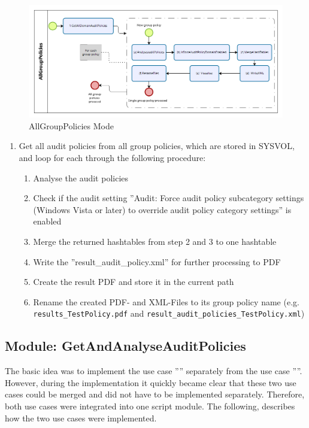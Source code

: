 \begin{figure}[H]
    \centering
    \includegraphics[width=1\linewidth]{assets/modes/allgrouppolicies.png}
    \caption{AllGroupPolicies Mode}
\end{figure}
\begin{enumerate}
    \item Get all audit policies from all group policies, which are stored in SYSVOL, and loop for each through the following procedure:
    \begin{enumerate}
        \item Analyse the audit policies
        \item Check if the audit setting ''Audit: Force audit policy subcategory settings (Windows Vista or later) to override audit policy category settings'' is enabled
        \item Merge the returned hashtables from step 2 and 3 to one hashtable
        \item Write the ''result\_audit\_policy.xml'' for further processing to PDF
        \item Create the result PDF and store it in the current path
        \item Rename the created PDF- and XML-Files to its group policy name (e.g. \lstinline|results_TestPolicy.pdf| and \lstinline|result_audit_policies_TestPolicy.xml|)
    \end{enumerate}
\end{enumerate}

\clearpage

\subsection{Module: GetAndAnalyseAuditPolicies}
The basic idea was to implement the use case '''' separately from the use case ''''. However, during the implementation it quickly became clear that these two use cases could be merged and did not have to be implemented separately. Therefore, both use cases were integrated into one script module. The following, describes how the two use cases were implemented.

